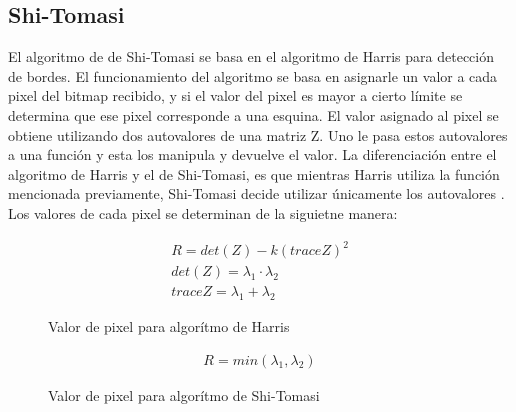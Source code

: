 \subsection{Shi-Tomasi}
El algoritmo de de Shi-Tomasi se basa en el algoritmo de Harris para detección de bordes. El funcionamiento del algoritmo se basa en asignarle un valor a cada pixel del bitmap recibido, y si el valor del pixel es mayor a cierto límite se determina que ese pixel corresponde a una esquina. El valor asignado al pixel se obtiene utilizando dos autovalores de una matriz Z. Uno le pasa estos autovalores a una función y esta los manipula y devuelve el valor.
La diferenciación entre el algoritmo de Harris y el de Shi-Tomasi, es que mientras Harris utiliza la función mencionada previamente, Shi-Tomasi decide utilizar únicamente los autovalores \cite{ref:shi-tomasi}.
\\ Los valores de cada pixel se determinan de la siguietne manera:

\begin{figure}[H]
\begin{align}
R= det(Z) - k (trace Z )^2 \\
det(Z)= \lambda_1 \cdot \lambda_2 \\
trace Z = \lambda_1 + \lambda_2
\end{align}
\label{eq:harris}
\caption{Valor de pixel para algorítmo de Harris}
\end{figure}

\begin{figure}[H]
\begin{align}
R= min(\lambda_1 , \lambda_2)
\end{align}
\label{eq:shitom}
\caption{Valor de pixel para algorítmo de Shi-Tomasi}
\end{figure}

